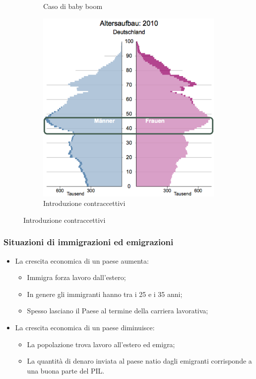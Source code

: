 \documentclass{article}
\begin{document}
\begin{figure}[htbp]
\begin{subfigure}[b]{0.3\textwidth}
      \caption{Caso di baby boom}
      \label{fig:immagine2}
    \end{subfigure}
    \hfill
    \begin{subfigure}[b]{0.3\textwidth}
      \centering
      \includegraphics[width=\textwidth]{media/demo_contraccettivi.png}
      \caption{Introduzione contraccettivi}
      \label{fig:immagine3}
    \end{subfigure}
\end{figure}

\subsubsection{Situazioni di immigrazioni ed emigrazioni}
\begin{itemize}
    \item La crescita economica di un paese aumenta:
    \begin{itemize}[label=$\circ$]
        \item Immigra forza lavoro dall'estero;
        \item In genere gli immigranti hanno tra i 25 e i 35 anni;
        \item Spesso lasciano il Paese al termine della carriera lavorativa;
    \end{itemize}
    \item La crescita economica di un paese diminuisce:
    \begin{itemize}[label=$\circ$]
        \item La popolazione trova lavoro all'estero ed emigra;
        \item La quantità di denaro inviata al paese natio dagli emigranti corrisponde a una
            buona parte del PIL.
    \end{itemize}
\end{itemize}
\phantom{}
\end{document}

